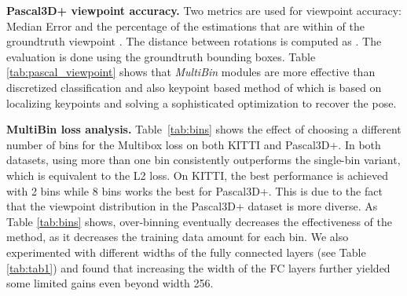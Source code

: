 \documentclass[10pt,twocolumn,letterpaper]{article}
\begin{document}
\noindent\textbf{Pascal3D+ viewpoint accuracy.} Two metrics are used for viewpoint accuracy: Median Error  and the percentage of the estimations that are within  of the groundtruth viewpoint . The distance between rotations is computed as . The evaluation is done using the groundtruth bounding boxes. Table \ref{tab:pascal_viewpoint} shows that \emph{MultiBin} modules are more effective than discretized classification \cite{TulsianiCVPR15} and also keypoint based method of \cite{PavlakosICRA17} which is based on localizing keypoints and solving a sophisticated optimization to recover the pose.

\noindent\textbf{MultiBin loss analysis.} Table~\ref{tab:bins} shows the effect of choosing a different number of bins for the Multibox loss on both KITTI and Pascal3D+. In both datasets, using more than one bin consistently outperforms the single-bin variant, which is equivalent to the L2 loss. On KITTI, the best performance is achieved with 2 bins while 8 bins works the best for Pascal3D+. This is due to the fact that the viewpoint distribution in the Pascal3D+ dataset is more diverse. As Table \ref{tab:bins} shows, over-binning eventually decreases the effectiveness of the method, as it decreases the training data amount for each bin. We also experimented with different widths of the fully connected layers (see Table \ref{tab:tab1}) and found that increasing the width of the FC layers further yielded some limited gains even beyond width 256.
\end{document}
